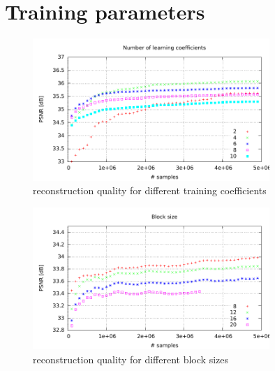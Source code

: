 \section{Training parameters}
\begin{figure}[h]
\centering
\includegraphics[width = 0.8\textwidth]{../tests/results/coeffsConverg.pdf}
\caption{reconstruction quality for different training coefficients}
\label{fig:dict size}
\end{figure}
\begin{figure}[h]
\centering
\includegraphics[width = 0.8\textwidth]{../tests/results/blockSizeConverg.pdf}
\caption{reconstruction quality for different block sizes}
\label{fig:dict size}
\end{figure}


